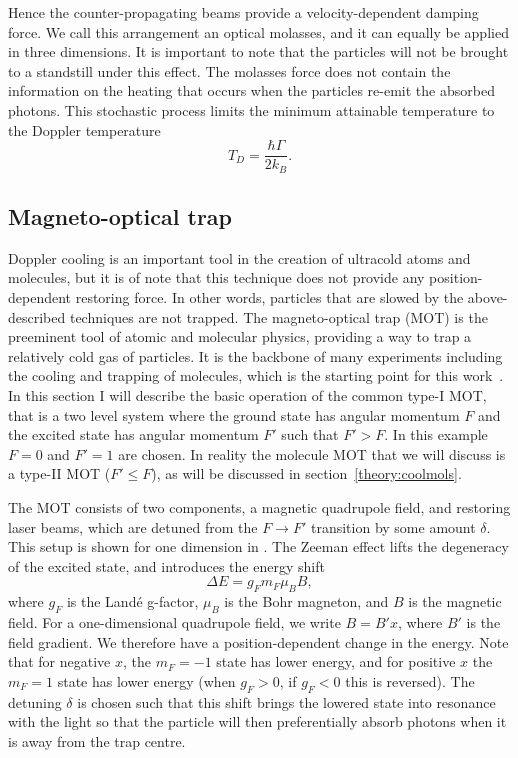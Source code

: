 Hence the counter-propagating beams provide a velocity-dependent damping
force. We call this arrangement an optical molasses, and it can equally be
applied in three dimensions.
%
It is important to note that the particles will not be brought to a standstill
under this effect. The molasses force does not contain the information
on the heating that occurs when the particles re-emit the absorbed photons.
This stochastic process limits the minimum attainable temperature to the
Doppler temperature~\cite{Metcalf1999}
%
\begin{equation}
  T_D = \frac{\hbar\Gamma}{2k_B}.
\end{equation}

\subsection{Magneto-optical trap}

Doppler cooling is an important tool in the creation of ultracold atoms and
molecules, but it is of note that this technique does not provide any
position-dependent restoring force. In other words, particles that are slowed
by the above-described techniques are not trapped.
%
The magneto-optical trap (MOT) is the preeminent tool of atomic and molecular
physics, providing a way to trap a relatively cold gas of particles. It is the
backbone of many experiments including the cooling and trapping of \CaF{}
molecules, which is the starting point for this work~\cite{Williams2017}. In
this section I will describe the basic operation of the common type-I MOT, that
is a two level system where the ground state has angular momentum $F$ and the
excited state has angular momentum $F'$ such that $F'>F$. In this example $F=0$
and $F'=1$ are chosen.  In reality the molecule MOT that we will discuss is a
type-II MOT ($F'\leq F$), as will be discussed in
section~\ref{theory:coolmols}.

The MOT consists of two components, a magnetic quadrupole field, and restoring
laser beams, which are detuned from the $F\rightarrow F'$ transition by some
amount $\delta$. This setup is shown for one dimension in
. The Zeeman effect lifts the degeneracy of the excited state, and
introduces the energy shift~\cite{Binney}
%
\begin{equation}
  \Delta E = g_F m_F \mu_B B,
  \label{theory:eqn:zeeman}
\end{equation}
%
where $g_F$ is the Land\'e g-factor, $\mu_B$ is the Bohr magneton, and $B$ is
the magnetic field. For a one-dimensional quadrupole field, we write $B=B'x$,
where $B'$ is the field gradient. We therefore have a position-dependent change
in the energy. Note that for negative $x$, the $m_F=-1$ state has lower energy,
and for positive $x$ the $m_F=1$ state has lower energy (when $g_F>0$, if
$g_F<0$ this is reversed).
%
The detuning $\delta$ is chosen such that this shift brings the lowered state
into resonance with the light so that the particle will then preferentially
absorb photons when it is away from the trap centre.

